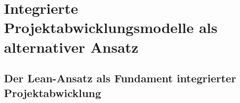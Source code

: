 %
%
%
%
%
%

\clearpage

\section{Integrierte Projektabwicklungsmodelle als alternativer Ansatz}
\label{sec: 2.2}


\subsection{Der Lean-Ansatz als Fundament integrierter Projektabwicklung}
\label{sec:2.2.1}

